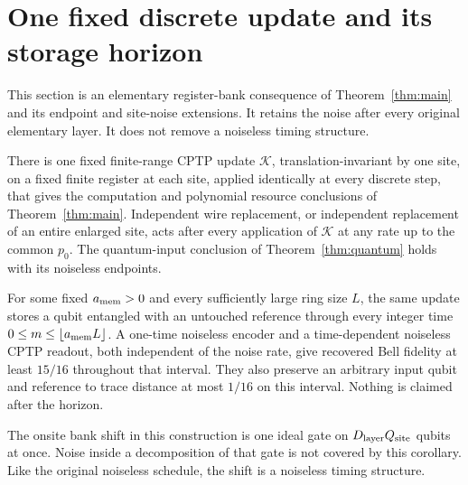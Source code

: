 \section{One fixed discrete update and its storage horizon}\label{sec:fixed-channel}
This section is an elementary register-bank consequence of Theorem~\ref{thm:main} and its endpoint and site-noise extensions. It retains the noise after every original elementary layer. It does not remove a noiseless timing structure.

\begin{corollary}\label{cor:fixed-channel}
There is one fixed finite-range CPTP update $\mathcal K$, translation-invariant by one site, on a fixed finite register at each site, applied identically at every discrete step, that gives the computation and polynomial resource conclusions of Theorem~\ref{thm:main}. Independent wire replacement, or independent replacement of an entire enlarged site, acts after every application of $\mathcal K$ at any rate up to the common $p_0$. The quantum-input conclusion of Theorem~\ref{thm:quantum} holds with its noiseless endpoints.

For some fixed $a_{\rm mem}>0$ and every sufficiently large ring size $L$, the same update stores a qubit entangled with an untouched reference through every integer time $0\le m\le\lfloor a_{\rm mem}L\rfloor$. A one-time noiseless encoder and a time-dependent noiseless CPTP readout, both independent of the noise rate, give recovered Bell fidelity at least $15/16$ throughout that interval. They also preserve an arbitrary input qubit and reference to trace distance at most $1/16$ on this interval. Nothing is claimed after the horizon.

The onsite bank shift in this construction is one ideal gate on $D_{\rm layer}Q_{\rm site}$ qubits at once. Noise inside a decomposition of that gate is not covered by this corollary. Like the original noiseless schedule, the shift is a noiseless timing structure.
\end{corollary}
